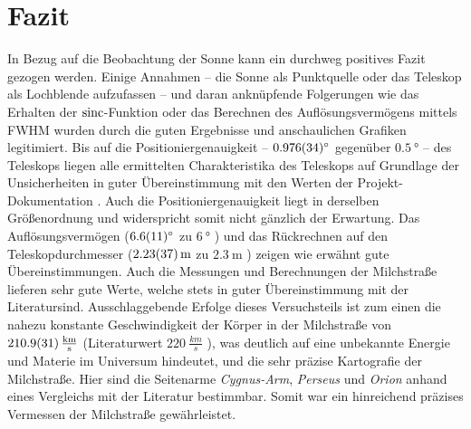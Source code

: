 \section{Fazit}
In Bezug auf die Beobachtung der Sonne kann ein durchweg positives Fazit gezogen werden.
Einige Annahmen -- die Sonne als Punktquelle oder das Teleskop als Lochblende aufzufassen -- und daran anknüpfende Folgerungen wie das Erhalten der $\operatorname{sinc}$-Funktion oder das Berechnen des Auflösungsvermögens mittels FWHM wurden durch die guten Ergebnisse und anschaulichen Grafiken legitimiert.
Bis auf die Positioniergenauigkeit -- $\SI{0.976 \pm 0.034}{\degree}$ gegenüber $\SI{0.5}{\degree}$ -- des Teleskops liegen alle ermittelten Charakteristika des Teleskops auf Grundlage der Unsicherheiten in guter Übereinstimmung mit den Werten der Projekt-Dokumentation \cite{Usermanual}.
Auch die Positioniergenauigkeit liegt in derselben Größenordnung und widerspricht somit nicht gänzlich der Erwartung.
Das Auflösungsvermögen ($\SI{6.6 \pm 1.1}{\degree}$ zu $\SI{6}{\degree}$ \cite{Usermanual}) und das Rückrechnen auf den Teleskopdurchmesser ($\SI{2.23 \pm 0.37}{\metre}$ zu $\SI{2.3}{\metre}$ \cite{Usermanual}) zeigen wie erwähnt gute Übereinstimmungen.\newline
Auch die Messungen und Berechnungen der Milchstraße lieferen sehr gute Werte, welche stets in guter Übereinstimmung mit der Literatursind. Ausschlaggebende Erfolge dieses Versuchsteils ist zum einen die nahezu konstante Geschwindigkeit der Körper in der Milchstraße von $\SI{210.9 \pm 3.1}{\frac{km}{s}}$ (Literaturwert $\SI{220}{\frac{km}{s}}$ \cite{LSR}), was deutlich auf eine unbekannte Energie und Materie im Universum hindeutet, und die sehr präzise Kartografie der Milchstraße. Hier sind die Seitenarme \textit{Cygnus-Arm}, \textit{Perseus} und \textit{Orion} anhand eines Vergleichs mit der Literatur bestimmbar.
Somit war ein hinreichend präzises Vermessen der Milchstraße gewährleistet.